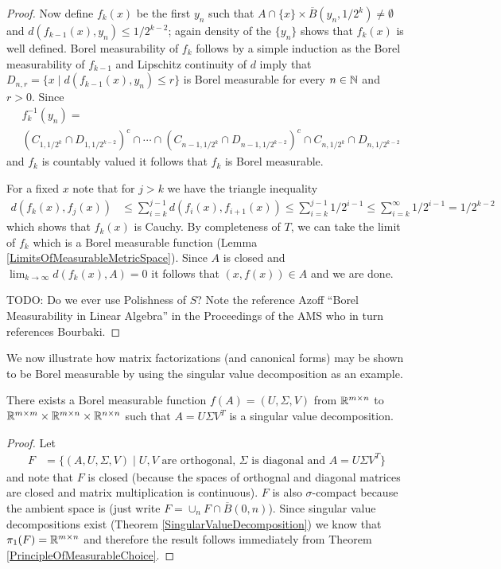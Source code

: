 \begin{proof}
Now define $f_k(x)$ be the first $y_n$ such that $A \cap \lbrace x \rbrace \times \overline{B}(y_n, 1/2^k) \neq \emptyset$ and $d(f_{k-1}(x), y_n) \leq 1/2^{k-2}$; again density of the $\lbrace y_n \rbrace$ shows that $f_k(x)$ is well defined.  Borel measurability of $f_k$ follows by a simple induction as the Borel measurability of $f_{k-1}$ and Lipschitz continuity of $d$ imply that $D_{n,r} = \lbrace x \mid d(f_{k-1}(x), y_n) \leq r \rbrace$ is Borel measurable for every $n \in \mathbb{N}$ and $r > 0$.  Since 
\begin{align*}
&f_k^{-1}(y_n) = \\
&(C_{1,1/2^k} \cap D_{1, 1/2^{k-2}})^c \cap \dotsb \cap (C_{n-1,1/2^k} \cap D_{n-1, 1/2^{k-2}})^c \cap  C_{n,1/2^k} \cap D_{n, 1/2^{k-2}}
\end{align*}
and $f_k$ is countably valued it follows that $f_k$ is Borel measurable.

For a fixed $x$ note that for $j > k$ we have the triangle inequality
\begin{align*}
d(f_k(x), f_j(x)) &\leq \sum_{i=k}^{j-1} d(f_i(x), f_{i+1}(x)) \leq \sum_{i=k}^{j-1} 1/2^{i-1} \leq \sum_{i=k}^\infty 1/2^{i-1} = 1/2^{k-2}
\end{align*}
which shows that $f_k(x)$ is Cauchy.  By completeness of $T$, we can take 
the limit of $f_k$ which is a Borel measurable function (Lemma \ref{LimitsOfMeasurableMetricSpace}).  Since $A$ is closed and $\lim_{k \to \infty} d(f_k(x), A) = 0$ it follows that $(x,f(x)) \in A$ and we are done.

TODO: Do we ever use Polishness of $S$?  Note the reference Azoff ``Borel Measurability in Linear Algebra'' in the Proceedings of the AMS who in turn references Bourbaki.
\end{proof}

We now illustrate how matrix factorizations (and canonical forms) may be shown to be Borel measurable by using the singular value decomposition as an example.  
\begin{cor}\label{BorelMeasurabilitySVD}There exists a Borel measurable function $f (A) = (U,\Sigma,V)$ from  $\mathbb{R}^{m\times n}$ to $\mathbb{R}^{m \times m} \times \mathbb{R}^{m \times n} \times \mathbb{R}^{n \times n}$ such that $A = U \Sigma V^T$ is a singular value decomposition.
\end{cor}
\begin{proof}
Let 
\begin{align*}
F &= \lbrace (A, U,\Sigma, V) \mid \text{$U, V$ are orthogonal, $\Sigma$ is diagonal and $A = U \Sigma V^T$} \rbrace
\end{align*}
and note that $F$ is closed (because the spaces of orthognal and diagonal matrices are closed and matrix multiplication is continuous).  $F$ is also $\sigma$-compact because the ambient space is (just write $F = \cup_n F \cap \overline{B}(0,n)$).  Since singular value decompositions exist (Theorem \ref{SingularValueDecomposition}) we know that $\pi_1(F) = \mathbb{R}^{m \times n}$ and therefore the result follows immediately from Theorem \ref{PrincipleOfMeasurableChoice}.
\end{proof}

